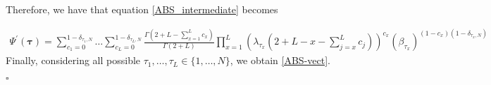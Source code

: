 \documentclass[10pt]{article}
\numberwithin{equation}{section}
\numberwithin{equation}{subsection}
\begin{document}
Therefore, we have that equation \eqref{ABS_intermediate} becomes


\begin{equation}\label{elementsABS}
	\begin{split}
		\Psi^{'}(\bm{\tau})=\sum_{c_{1}=0}^{1-\delta_{\tau_{1},N}}\ldots\sum_{c_{L}=0}^{1-\delta_{\tau_{L},N}}\frac{\Gamma(2+L-\sum_{x=1}^{L}c_{x})}{\Gamma(2+L)}\prod_{x=1}^{L}\left(\lambda_{\tau_{x}}\left(2+L-x-\sum_{j=x}^{L}c_{j}\right)\right)^{c_{x}}\left(\beta_{\tau_{x}}\right)^{(1-c_{x})(1-\delta_{\tau_{x},N})}
	\end{split}
\end{equation} 
Finally, considering all possible $\tau_{1},\ldots,\tau_{L}\in \{1,\ldots,N\}$, we obtain \eqref{ABS-vect}.
\begin{flushright}
    $\square$
\end{flushright}
\end{document}

